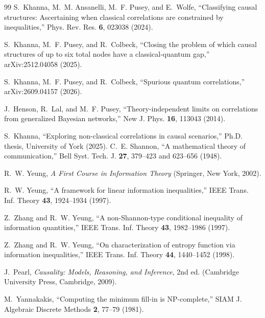 \documentclass[11pt]{article}
\theoremstyle{definition}
\begin{document}
\begin{thebibliography}{99}
 S.~Khanna, M.~M. Ansanelli, M.~F. Pusey, and E.~Wolfe, ``Classifying causal structures: Ascertaining when classical correlations are constrained by inequalities,'' Phys. Rev. Res. \textbf{6}, 023038 (2024).

 S.~Khanna, M.~F. Pusey, and R.~Colbeck, ``Closing the problem of which causal structures of up to six total nodes have a classical-quantum gap,'' arXiv:2512.04058 (2025).

 S.~Khanna, M.~F. Pusey, and R.~Colbeck, ``Spurious quantum correlations,'' arXiv:2609.04157 (2026).

 J.~Henson, R.~Lal, and M.~F. Pusey, ``Theory-independent limits on correlations from generalized Bayesian networks,'' New J. Phys. \textbf{16}, 113043 (2014).

 S.~Khanna, ``Exploring non-classical correlations in causal scenarios,'' Ph.D. thesis, University of York (2025).
 C.~E. Shannon, ``A mathematical theory of communication,'' Bell Syst. Tech. J. \textbf{27}, 379--423 and 623--656 (1948).

 R.~W. Yeung, \emph{A First Course in Information Theory} (Springer, New York, 2002).

 R.~W. Yeung, ``A framework for linear information inequalities,'' IEEE Trans. Inf. Theory \textbf{43}, 1924--1934 (1997).

 Z.~Zhang and R.~W. Yeung, ``A non-Shannon-type conditional inequality of information quantities,'' IEEE Trans. Inf. Theory \textbf{43}, 1982--1986 (1997).

 Z.~Zhang and R.~W. Yeung, ``On characterization of entropy function via information inequalities,'' IEEE Trans. Inf. Theory \textbf{44}, 1440--1452 (1998).

 J.~Pearl, \emph{Causality: Models, Reasoning, and Inference}, 2nd ed. (Cambridge University Press, Cambridge, 2009).

 M.~Yannakakis, ``Computing the minimum fill-in is NP-complete,'' SIAM J. Algebraic Discrete Methods \textbf{2}, 77--79 (1981).

\end{thebibliography}
\end{document}
